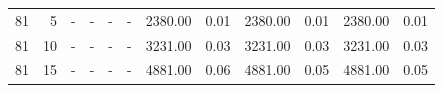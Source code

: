 \begin{table}
\begin{tabular}{@{}rrrrrrrrrrrr@{}}
81                                                                               & 5                                                                                     & -                                                                      & -                                                                  & -                                                                      & -                                                                 & 2380.00                                                                     & 0.01                                                                   & 2380.00                                                                     & 0.01                                                                   & 2380.00                                                                     & 0.01                                                                   \\
81                                                                               & 10                                                                                    & -                                                                      & -                                                                  & -                                                                      & -                                                                 & 3231.00                                                                     & 0.03                                                                   & 3231.00                                                                     & 0.03                                                                   & 3231.00                                                                     & 0.03                                                                   \\
81                                                                               & 15                                                                                    & -                                                                      & -                                                                  & -                                                                      & -                                                                 & 4881.00                                                                     & 0.06                                                                   & 4881.00                                                                     & 0.05                                                                   & 4881.00                                                                     & 0.05                                                                   \\

\end{tabular}
\end{table}
